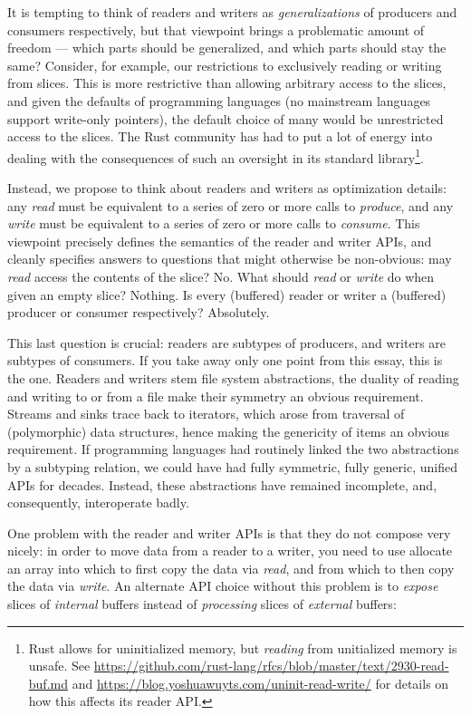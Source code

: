 \documentclass[sigplan,screen,10pt,anonymous,review]{acmart}
\begin{document}
It is tempting to think of readers and writers as \textit{generalizations} of producers and consumers respectively, but that viewpoint brings a problematic amount of freedom --- which parts should be generalized, and which parts should stay the same? Consider, for example, our restrictions to exclusively reading or writing from slices. This is more restrictive than allowing arbitrary access to the slices, and given the defaults of programming languages (no mainstream languages support write-only pointers), the default choice of many would be unrestricted access to the slices. The Rust community has had to put a lot of energy into  dealing with the consequences of such an oversight in its standard library\footnote{Rust allows for uninitialized memory, but \textit{reading} from unitialized memory is unsafe. See \url{https://github.com/rust-lang/rfcs/blob/master/text/2930-read-buf.md} and \url{https://blog.yoshuawuyts.com/uninit-read-write/} for details on how this affects its reader API.}.

Instead, we propose to think about readers and writers as optimization details: any \textit{read} must be equivalent to a series of zero or more calls to \textit{produce}, and any \textit{write} must be equivalent to a series of zero or more calls to \textit{consume}. This viewpoint precisely defines the semantics of the reader and writer APIs, and cleanly specifies answers to questions that might otherwise be non-obvious: may \textit{read} access the contents of the slice? No. What should \textit{read} or \textit{write} do when given an empty slice? Nothing. Is every (buffered) reader or writer a (buffered) producer or consumer respectively? Absolutely.

This last question is crucial: readers are subtypes of producers, and writers are subtypes of consumers. If you take away only one point from this essay, this is the one. Readers and writers stem file system abstractions, the duality of reading and writing to or from a file make their symmetry an obvious requirement. Streams and sinks trace back to iterators, which arose from traversal of (polymorphic) data structures, hence making the genericity of items an obvious requirement. If programming languages had routinely linked the two abstractions by a subtyping relation, we could have had fully symmetric, fully generic, unified APIs for decades. Instead, these abstractions have remained incomplete, and, consequently, interoperate badly.

One problem with the reader and writer APIs is that they do not compose very nicely: in order to move data from a reader to a writer, you need to use allocate an array into which to first copy the data via \textit{read}, and from which to then copy the data via \textit{write}. An alternate API choice without this problem is to \textit{expose} slices of \textit{internal} buffers instead of \textit{processing} slices of \textit{external} buffers:
\end{document}
